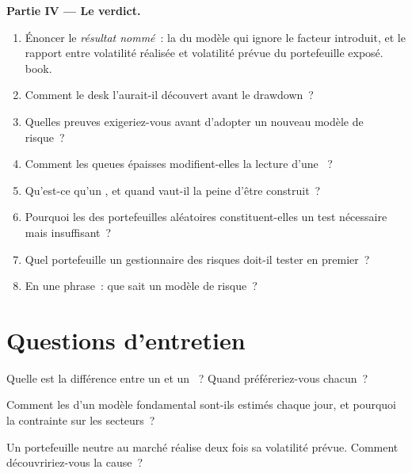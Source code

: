 \begin{problem}
\medskip\noindent\textbf{Partie IV --- Le verdict.}
\begin{enumerate}[resume]
\item Énoncer le \emph{résultat nommé}~: la  du modèle qui ignore le facteur introduit, et le rapport entre volatilité réalisée et volatilité prévue du portefeuille exposé.
book.
\item Comment le desk l'aurait-il découvert avant le drawdown~?
\item Quelles preuves exigeriez-vous avant d'adopter un nouveau modèle de risque~?
\item Comment les queues épaisses modifient-elles la lecture d'une ~?
\item Qu'est-ce qu'un , et quand vaut-il la peine d'être construit~?
\item Pourquoi les  des portefeuilles aléatoires constituent-elles un test nécessaire mais insuffisant~?
\item Quel portefeuille un gestionnaire des risques doit-il tester en premier~?
\item En une phrase~: que sait un modèle de risque~?
\end{enumerate}
\end{problem}

\section{Questions d'entretien}

\begin{interviewq}\label{iq:rs:risk-models:1}
Quelle est la différence entre un  et un ~? Quand préféreriez-vous chacun~?
\end{interviewq}

\begin{interviewq}\label{iq:rs:risk-models:2}
Comment les  d'un modèle fondamental sont-ils estimés chaque jour, et pourquoi la contrainte sur les secteurs~?
\end{interviewq}

\begin{interviewq}\label{iq:rs:risk-models:3}
Un portefeuille neutre au marché réalise deux fois sa volatilité prévue. Comment découvririez-vous la cause~?
\end{interviewq}

